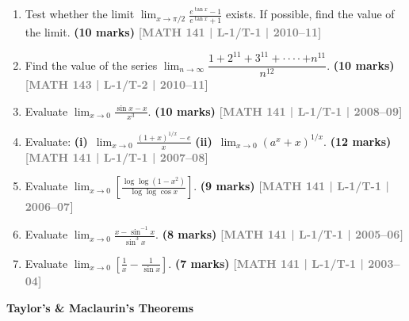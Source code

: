 \documentclass[12pt,a4paper]{article}
\newcommand{\yr}[1]{\hfill\textcolor{gray}{\small\textbf{[#1]}}}
\newcommand{\mk}[1]{\textcolor{orange!70!black}{\small\textbf{(#1 marks)}}}
\newcommand{\subtopic}[2]{%
  \vspace{10pt}
  \noindent\begin{tcolorbox}[colback=#1!8,colframe=#1,boxrule=0.6pt,arc=4pt,
    left=6pt,right=6pt,top=4pt,bottom=4pt]
    \small\bfseries\textcolor{#1}{#2}
  \end{tcolorbox}
  \vspace{2pt}
}
\begin{document}
\begin{enumerate}
\item Test whether the limit $\displaystyle\lim_{x\to\pi/2}\frac{e^{\tan x}-1}{e^{\tan x}+1}$ exists. If possible, find the value of the limit.
\mk{10} \yr{MATH 141 | L-1/T-1 | 2010--11}

\item Find the value of the series $\displaystyle\lim_{n\to\infty}\dfrac{1+2^{11}+3^{11}+\cdot\cdot\cdot\cdot+n^{11}}{n^{12}}$.
\mk{10} \yr{MATH 143 | L-1/T-2 | 2010--11}

\item Evaluate $\displaystyle\lim_{x\to 0}\frac{\sin x - x}{x^{3}}$.
\mk{10} \yr{MATH 141 | L-1/T-1 | 2008--09}

\item Evaluate: \textbf{(i)}~$\displaystyle\lim_{x\to 0}\frac{(1+x)^{1/x}-e}{x}$ \quad \textbf{(ii)}~$\displaystyle\lim_{x\to 0}(a^{x}+x)^{1/x}$.
\mk{12} \yr{MATH 141 | L-1/T-1 | 2007--08}

\item Evaluate $\displaystyle\lim_{x\to 0}\left[\frac{\log\log(1-x^{2})}{\log\log\cos x}\right]$.
\mk{9} \yr{MATH 141 | L-1/T-1 | 2006--07}

\item Evaluate $\displaystyle\lim_{x\to 0}\frac{x-\sin^{-1}x}{\sin^{3}x}$.
\mk{8} \yr{MATH 141 | L-1/T-1 | 2005--06}

\item Evaluate $\displaystyle\lim_{x\to 0}\left[\frac{1}{x}-\frac{1}{\sin x}\right]$.
\mk{7} \yr{MATH 141 | L-1/T-1 | 2003--04}


\end{enumerate}

\subtopic{cA}{Taylor's \& Maclaurin's Theorems}
\label{sub:s1-taylor}
\end{document}
